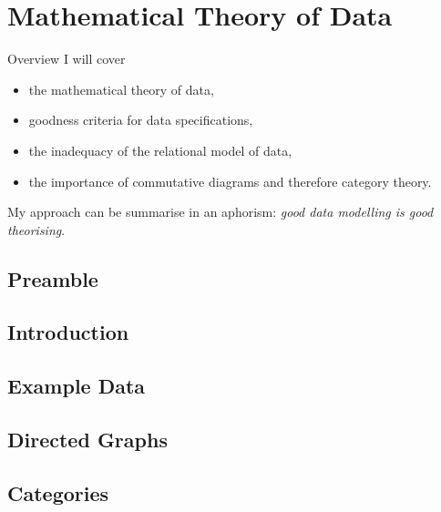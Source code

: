 \section{Mathematical Theory of Data}

\begin{frame}{Overview}
I will cover
\begin{itemize}
\item the mathematical theory of data,
\item goodness criteria for data specifications,
\item the inadequacy of the relational model of data,
\item the importance of commutative diagrams and therefore category theory.
\end{itemize}

\medskip
\pause
My approach can be summarise in an aphorism:
\textit{good data modelling is good theorising}.

\end{frame}

\iffalse
\subsection{Example}
\begin{frame}{Example -- LCMSMS Data}
\scalebox{0.2}{

}
\end{frame}
\fi

\subsection{Preamble}


\subsection{Introduction}


\subsection{Example Data}


\subsection{Directed Graphs}


\subsection{Categories}

